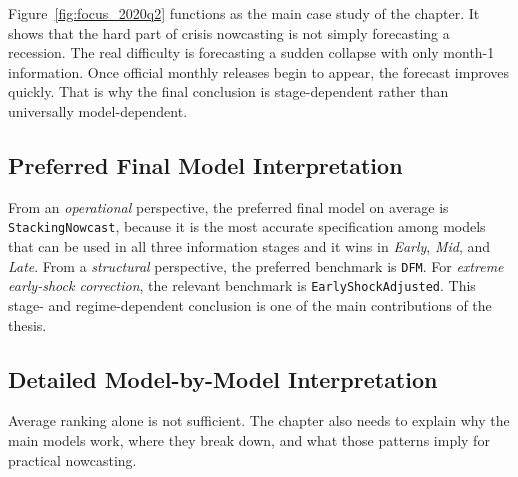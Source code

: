 \documentclass[12pt,a4paper]{article}
\begin{document}
Figure~\ref{fig:focus_2020q2} functions as the main case study of the chapter. It shows that the hard part of crisis nowcasting is not simply forecasting a recession. The real difficulty is forecasting a sudden collapse with only month-1 information. Once official monthly releases begin to appear, the forecast improves quickly. That is why the final conclusion is stage-dependent rather than universally model-dependent.

\subsection{Preferred Final Model Interpretation}

From an \textit{operational} perspective, the preferred final model on average is \texttt{StackingNowcast}, because it is the most accurate specification among models that can be used in all three information stages and it wins in \textit{Early}, \textit{Mid}, and \textit{Late}. From a \textit{structural} perspective, the preferred benchmark is \texttt{DFM}. For \textit{extreme early-shock correction}, the relevant benchmark is \texttt{EarlyShockAdjusted}. This stage- and regime-dependent conclusion is one of the main contributions of the thesis.

\subsection{Detailed Model-by-Model Interpretation}

Average ranking alone is not sufficient. The chapter also needs to explain why the main models work, where they break down, and what those patterns imply for practical nowcasting.
\end{document}
